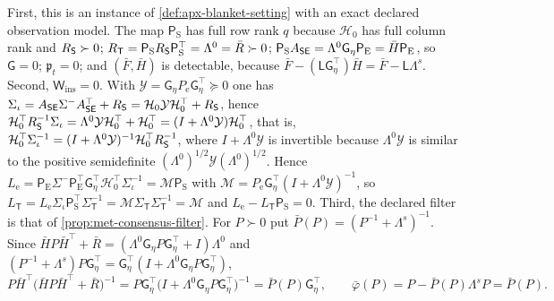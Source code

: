 \begin{remark}
First, this is an instance of \cref{def:apx-blanket-setting} with an exact declared observation model. The map $\mathsf P_{\mathrm S}$ has full row rank $q$ because $\mathcal H_0$ has full column rank and $R_{\mathsf{S}}\succ0$; $R_{\mathsf T}=\mathsf P_{\mathrm S}R_{\mathsf{S}}\mathsf P_{\mathrm S}^\top=\Lambda^0=\bar R\succ0$; $\mathsf P_{\mathrm S}A_{\mathsf{S}\mathsf{E}}=\Lambda^0\mathsf G_\eta\mathsf P_{\mathrm E}=\bar H\mathsf P_{\mathrm E}$, so $\mathsf G=0$; $\mathfrak p_t=0$; and $(\bar F,\bar H)$ is detectable, because $\bar F-(\mathsf L\mathsf G_\eta^\top)\bar H=\bar F-\mathsf L\Lambda^s$. Second, $\mathsf W_{\mathrm{ins}}=0$. With $\mathcal Y=\mathsf G_\eta P_{\mathrm e}\mathsf G_\eta^\top\succeq0$ one has $\Sigma_\iota=A_{\mathsf{S}\mathsf{E}}\Sigma^-A_{\mathsf{S}\mathsf{E}}^\top+R_{\mathsf{S}}=\mathcal H_0\mathcal Y\mathcal H_0^\top+R_{\mathsf{S}}$, hence $\mathcal H_0^\top R_{\mathsf{S}}^{-1}\Sigma_\iota=\Lambda^0\mathcal Y\mathcal H_0^\top+\mathcal H_0^\top=(I+\Lambda^0\mathcal Y)\mathcal H_0^\top$, that is, $\mathcal H_0^\top\Sigma_\iota^{-1}=(I+\Lambda^0\mathcal Y)^{-1}\mathcal H_0^\top R_{\mathsf{S}}^{-1}$, where $I+\Lambda^0\mathcal Y$ is invertible because $\Lambda^0\mathcal Y$ is similar to the positive semidefinite $(\Lambda^0)^{1/2}\mathcal Y(\Lambda^0)^{1/2}$. Hence $L_{\mathrm e}=\mathsf P_{\mathrm E}\Sigma^-\mathsf P_{\mathrm E}^\top\mathsf G_\eta^\top\mathcal H_0^\top\Sigma_\iota^{-1}=\mathcal M\mathsf P_{\mathrm S}$ with $\mathcal M=P_{\mathrm e}\mathsf G_\eta^\top(I+\Lambda^0\mathcal Y)^{-1}$, so $L_{\mathsf T}=L_{\mathrm e}\Sigma_\iota\mathsf P_{\mathrm S}^\top\Sigma_{\mathsf T}^{-1}=\mathcal M\Sigma_{\mathsf T}\Sigma_{\mathsf T}^{-1}=\mathcal M$ and $L_{\mathrm e}-L_{\mathsf T}\mathsf P_{\mathrm S}=0$. Third, the declared filter is that of \cref{prop:met-consensus-filter}. For $P\succ0$ put $\bar P(P)=(P^{-1}+\Lambda^s)^{-1}$. Since $\bar HP\bar H^\top+\bar R=(\Lambda^0\mathsf G_\eta P\mathsf G_\eta^\top+I)\Lambda^0$ and $(P^{-1}+\Lambda^s)P\mathsf G_\eta^\top=\mathsf G_\eta^\top(I+\Lambda^0\mathsf G_\eta P\mathsf G_\eta^\top)$,
\begin{equation*}
P\bar H^\top\bigl(\bar HP\bar H^\top+\bar R\bigr)^{-1}=P\mathsf G_\eta^\top\bigl(I+\Lambda^0\mathsf G_\eta P\mathsf G_\eta^\top\bigr)^{-1}=\bar P(P)\mathsf G_\eta^\top,\qquad\bar\varphi(P)=P-\bar P(P)\Lambda^sP=\bar P(P) .
\end{equation*}

\end{remark}
